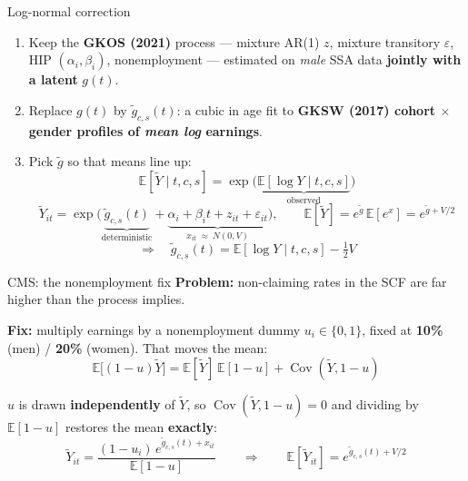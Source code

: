 \documentclass[10pt,aspectratio=169]{beamer}
\begin{document}
\begin{frame}{Log-normal correction}
  \small
  \begin{enumerate}\itemsep2pt
    \item Keep the \textbf{GKOS (2021)} process --- mixture AR(1) $z$, mixture transitory
      $\varepsilon$, HIP $(\alpha_i,\beta_i)$, nonemployment --- estimated on \emph{male} SSA
      data \textbf{jointly with a latent} $g(t)$.
    \item Replace $g(t)$ by $\tilde g_{c,s}(t)$: a cubic in age fit to \textbf{GKSW (2017)
      cohort $\times$ gender profiles of \emph{mean log} earnings}.
    \item Pick $\tilde g$ so that means line up:
      \vspace{-2pt}
      \[
        \mathbb{E}[\tilde Y\mid t,c,s]
          =\exp\bigl(\underbrace{\mathbb{E}[\log Y\mid t,c,s]}_{\text{observed}}\bigr)
      \]
      \vspace{-4pt}
      \[
        \tilde Y_{it}=\exp\bigl(\underbrace{\tilde g_{c,s}(t)}_{\text{deterministic}}
          +\underbrace{\alpha_i+\beta_i t+z_{it}+\varepsilon_{it}}_{x_{it}\ \approx\ N(0,V)}\bigr),
        \qquad
        \mathbb{E}[\tilde Y]=e^{\tilde g}\,\mathbb{E}[e^{x}]=e^{\tilde g+V/2}
      \]
      \vspace{-2pt}
      \[
        \Longrightarrow\quad
        \tilde g_{c,s}(t)=\mathbb{E}[\log Y\mid t,c,s]-\tfrac12 V
      \]
  \end{enumerate}
\end{frame}

\begin{frame}{CMS: the nonemployment fix}
  \small
  \textbf{Problem:} non-claiming rates in the SCF are far higher than the process implies.

  \medskip
  \textbf{Fix:} multiply earnings by a nonemployment dummy $u_{i}\in\{0,1\}$, fixed at
  \textbf{10\%} (men) / \textbf{20\%} (women). That moves the mean:
  \vspace{-2pt}
  \[
    \mathbb{E}\bigl[(1-u)\tilde Y\bigr]
      =\mathbb{E}[\tilde Y]\,\mathbb{E}[1-u]+\operatorname{Cov}(\tilde Y,1-u)
  \]
  \vspace{-15pt}

  \medskip
  $u$ is drawn \textbf{independently} of $\tilde Y$, so $\operatorname{Cov}(\tilde Y,1-u)=0$ and
  dividing by $\mathbb{E}[1-u]$ restores the mean \textbf{exactly}:
  \vspace{-2pt}
  \[
    \tilde Y_{it}=\frac{(1-u_{i})\,e^{\tilde g_{c,s}(t)+x_{it}}}{\mathbb{E}[1-u]}
    \qquad\Longrightarrow\qquad
    \mathbb{E}[\tilde Y_{it}]=e^{\tilde g_{c,s}(t)+V/2}
  \]
\end{frame}
\end{document}
